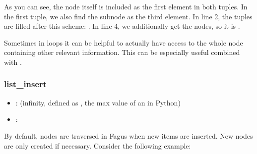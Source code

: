 \documentclass[a4paper,10pt,english]{sphinxmanual}
\begin{document}
\sphinxAtStartPar
As you can see, the node itself is included as the first element in both tuples. In the first tuple, we also find the subnode  as the third element. In line 2, the tuples are filled after this scheme: . In line 4, we additionally get the nodes, so it is .

\sphinxAtStartPar
Sometimes in loops it can be helpful to actually have access to the whole node containing other relevant information. This can be especially useful combined with {\hyperref[\detokenize{README:skipping-nodes-in-iteration}]{\emph{}}}.


\subsubsection{list\_insert}
\label{\detokenize{README:list-insert}}\begin{itemize}
\item {}
\sphinxAtStartPar
{}:  (infinity, defined as , the max value of an  in Python)

\item {}
\sphinxAtStartPar
{}: 

\end{itemize}

\sphinxAtStartPar
By default, \sphinxhyphen{}nodes are traversed in Fagus when new items are inserted. New \sphinxhyphen{}nodes are only created if necessary. Consider the following example:

\begin{sphinxVerbatim}[commandchars=\\\{\},numbers=left,firstnumber=1,stepnumber=1]
  \PYG{p}{[} \PYG{p}{[}  \PYG{p}{[} \PYG{p}{]} \PYG{p}{]}\PYG{p}{]}
  
\end{sphinxVerbatim}
\end{document}
